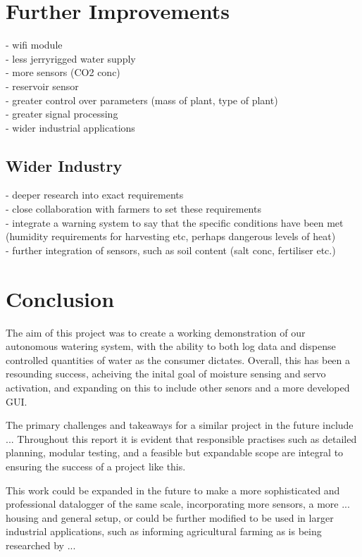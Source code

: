 \documentclass[a4paper,11pt]{article}
\begin{document}
\section{Further Improvements}
\label{sec:Further_Improvements}
- wifi module \\
- less jerryrigged water supply\\
- more sensors (CO2 conc)\\
- reservoir sensor\\
- greater control over parameters (mass of plant, type of plant)\\
- greater signal processing\\
- wider industrial applications

\subsection{Wider Industry}
\label{sec:Wider_Industry}
- deeper research into exact requirements\\
- close collaboration with farmers to set these requirements\\
- integrate a warning system to say that the specific conditions have been met (humidity requirements for harvesting etc, perhaps dangerous levels of heat)\\
- further integration of sensors, such as soil content (salt conc, fertiliser etc.)

\section{Conclusion}
\label{sec:Conclusion}

The aim of this project was to create a working demonstration of 
our autonomous watering system, with the ability to both log data
and dispense controlled quantities of water 
as the consumer dictates.
Overall, this has been a resounding success, 
acheiving the inital goal of moisture sensing and servo activation,
and expanding on this to include other senors 
and a more developed GUI.

The primary challenges and takeaways for a similar project in the future
include ...
Throughout this report it is evident that responsible practises 
such as detailed planning, modular testing,
and a feasible but expandable scope are integral to 
ensuring the success of a project like this.

This work could be expanded in the future to make a 
more sophisticated and professional datalogger
of the same scale,
incorporating more sensors, a more ... housing and 
general setup,
or could be further modified to be used in larger
industrial applications, such as informing agricultural farming
as is being researched by ...
\end{document}
